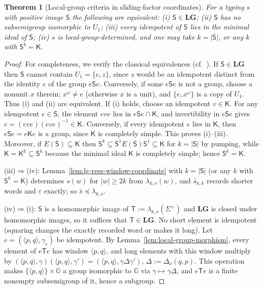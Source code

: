 \documentclass[11pt]{article}
\numberwithin{equation}{section}
\theoremstyle{plain}
\newtheorem{theorem}{Theorem}[section]
\theoremstyle{definition}
\theoremstyle{remark}
\newcommand{\eps}{\varepsilon}
\theoremstyle{plain}
\begin{document}
\begin{theorem}[Local-group criteria in sliding-factor coordinates]
\label{thm:lg-characterization}
For a typing $s$ with positive image $\mathsf S$ the following are equivalent:
\textup{(i)} $\mathsf S\in\mathbf{LG}$; \textup{(ii)} $\mathsf S$ has no subsemigroup isomorphic to
$U_1$; \textup{(iii)} every idempotent of $\mathsf S$ lies in the minimal ideal of $\mathsf S$;
\textup{(iv)} $s$ is local-group-determined, and one may take $k=|\mathsf S|$, or any $k$ with $\mathsf S^k=\mathsf K$.
\end{theorem}

\begin{proof}
For completeness, we verify the classical equivalences (cf.\
\cite[Proposition~2.3]{AlmeidaEtAl2009}).  If $\mathsf S\in\mathbf{LG}$
then $\mathsf S$ cannot contain $U_1=\{e,z\}$, since $z$ would be an idempotent
distinct from the identity $e$ of the group $e\mathsf Se$.
Conversely, if some $e\mathsf Se$ is not a group, choose a nonunit $x$ therein;
$x^\omega\ne e$ (otherwise $x$ is a unit), and
$\{e,x^\omega\}$ is a copy of $U_1$.  Thus (i) and (ii) are equivalent.
If (i) holds, choose an idempotent $v\in\mathsf K$.
For any idempotent $e\in\mathsf S$, the element $eve$ lies in
$e\mathsf Se\cap\mathsf K$, and invertibility in $e\mathsf Se$ gives
$e=(eve)(eve)^{-1}\in\mathsf K$.  Conversely, if every idempotent
$e$ lies in $\mathsf K$, then $e\mathsf Se=e\mathsf Ke$ is a group,
since $\mathsf K$ is completely simple.  This proves (i)--(iii).
Moreover, if $E(\mathsf S)\subseteq\mathsf K$ then
$\mathsf S^k\subseteq\mathsf S^1E(\mathsf S)\mathsf S^1\subseteq\mathsf K$
for $k=|\mathsf S|$ by pumping, while $\mathsf K=\mathsf K^k\subseteq\mathsf S^k$
because the minimal ideal $\mathsf K$ is completely simple; hence
$\mathsf S^k=\mathsf K$.

(iii)$\Rightarrow$(iv): Lemma~\ref{lem:lg-rees-window-coordinate} with
$k=|\mathsf S|$ (or any $k$ with $\mathsf S^k=\mathsf K$) determines $s(w)$ for $|w|\ge2k$ from
$\lambda_{k,\nu}(w)$, and $\widehat s_{k,k}$ records shorter words and $\eps$ exactly;
so $\widehat s\preceq\lambda_{k,\nu}$.

(iv)$\Rightarrow$(i): $\mathsf S$ is a homomorphic image of $\mathsf T:=\lambda_{k,\nu}(\Sigma^+)$ and
$\mathbf{LG}$ is closed under homomorphic images, so it suffices that $\mathsf T\in\mathbf{LG}$.
No short element is idempotent (squaring changes the exactly recorded word or makes
it long).  Let $e=(\langle p,q\rangle,\gamma_e)$ be idempotent.  By
Lemma~\ref{lem:local-group-morphism}, every element of $e\mathsf Te$ has window
$\langle p,q\rangle$, and long elements with this window multiply by
$(\langle p,q\rangle,\gamma)(\langle p,q\rangle,\gamma')=(\langle p,q\rangle,\gamma\Delta\gamma')$,
$\Delta:=\Delta_\nu(q,p)$.  This operation makes $\{\langle p,q\rangle\}\times {\mathbb G}$ a group
isomorphic to ${\mathbb G}$ via $\gamma\mapsto\gamma\Delta$, and $e\mathsf Te$ is a finite nonempty
subsemigroup of it, hence a subgroup.
\end{proof}
\end{document}
